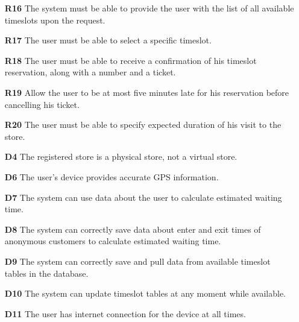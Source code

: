 \begin{enumerate}
\begin{enumerate}
			\item [\textbf{R16}] The system must be able to provide the user with the list of all available timeslots upon the request.
			\item [\textbf{R17}] The user must be able to select a specific timeslot.
			\item [\textbf{R18}] The user must be able to receive a confirmation of his timeslot reservation, along with a number and a ticket.
			\item [\textbf{R19}] Allow the user to be at most five minutes late for his reservation before cancelling his ticket.
			\item [\textbf{R20}] The user must be able to specify expected duration of his visit to the store.
			\item [\textbf{D4}] The registered store is a physical store, not a virtual store.
			\item [\textbf{D6}] The user's device provides accurate GPS information.
			\item [\textbf{D7}] The system can use data about the user to calculate estimated waiting time.
			\item [\textbf{D8}] The system can correctly save data about enter and exit times of anonymous customers to calculate estimated waiting time.
			\item [\textbf{D9}] The system can correctly save and pull data from available timeslot tables in the database.
			\item [\textbf{D10}] The system can update timeslot tables at any moment while available.
			\item [\textbf{D11}] The user has internet connection for the device at all times.
	\end{enumerate}
\end{enumerate}

